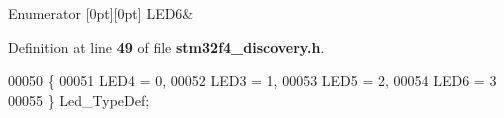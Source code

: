 \begin{DoxyEnumFields}{Enumerator}
[0pt][0pt]{}\mbox{\label{group__STM32F4__DISCOVERY__LOW__LEVEL__Exported__Types_ggaa059704b7ca945eb9c1e7f2c3d03fecda03c3d5ea066596a27a595c5f0a35ce62}} 
L\+E\+D6&\\
\hline

\end{DoxyEnumFields}


Definition at line \textbf{ 49} of file \textbf{ stm32f4\+\_\+discovery.\+h}.


\begin{DoxyCode}
00050 \{
00051   LED4 = 0,
00052   LED3 = 1,
00053   LED5 = 2,
00054   LED6 = 3
00055 \} Led_TypeDef;
\end{DoxyCode}
